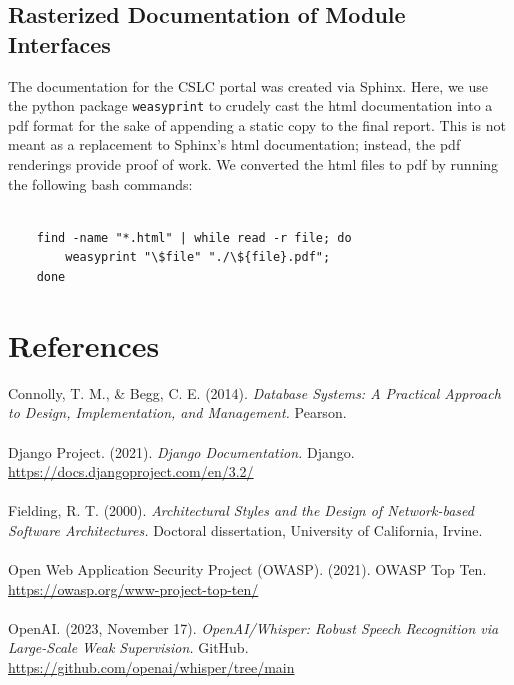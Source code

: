 \documentclass[oneside,openany,obeyspaces]{book}
\newcommand\tab[1][1cm]{\hspace*{#1}}
\begin{document}
\begin{flushleft}
    

    \section{Rasterized Documentation of Module Interfaces}

    \tab The documentation for the CSLC portal was created via Sphinx. Here, we use the python package \texttt{weasyprint} to crudely cast the html documentation into a pdf format for the sake of appending a static copy to the final report. This is not meant as a replacement to Sphinx's html documentation; instead, the pdf renderings provide proof of work. We converted the html files to pdf by running the following bash commands:\\~\\
    \begin{lstlisting}    
    find -name "*.html" | while read -r file; do 
        weasyprint "\$file" "./\${file}.pdf"; 
    done
    \end{lstlisting}

    
    \chapter{References}

    \hangindent=1cm Connolly, T. M., \& Begg, C. E. (2014). \textit{Database Systems: A Practical Approach to Design, Implementation, and Management.} Pearson.\\~\\

    \hangindent=1cm Django Project. (2021). \textit{Django Documentation.} Django. \url{https://docs.djangoproject.com/en/3.2/}\\~\\

    \hangindent=1cm Fielding, R. T. (2000). \textit{Architectural Styles and the Design of Network-based Software Architectures.} Doctoral dissertation, University of California, Irvine.\\~\\

    \hangindent=1cm Open Web Application Security Project (OWASP). (2021). OWASP Top Ten. \url{https://owasp.org/www-project-top-ten/}\\~\\

    \hangindent=1cm OpenAI. (2023, November 17). \textit{OpenAI/Whisper: Robust Speech Recognition via Large-Scale Weak Supervision.} GitHub. \url{https://github.com/openai/whisper/tree/main}\\~\\

\end{flushleft}
\end{document}
